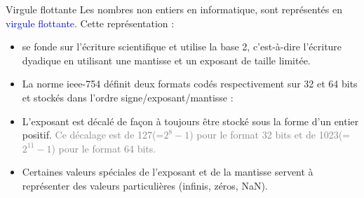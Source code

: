 \documentclass[10pt]{beamer}
\begin{document}
\begin{frame}{\Ctitle}{\stitle}
	\begin{alertblock}{Virgule flottante}
		Les nombres non entiers en informatique, sont représentés en  \textcolor{blue}{virgule flottante}. Cette représentation :
		\begin{itemize}
			\item<1-> se fonde sur l'écriture scientifique et utilise la base 2, c'est-à-dire l'écriture dyadique en utilisant une mantisse et un exposant de taille limitée.
			\item<2-> La norme {\sc ieee-754} définit deux formats codés respectivement sur 32 et 64 bits et stockés dans l'ordre signe/exposant/mantisse : \\
            \item<4->L'exposant est décalé de façon à toujours être stocké sous la forme d'un entier positif. \textcolor{gray}{Ce décalage est de 127(=$2^8-1$) pour le format 32 bits et de 1023(=$2^{11}-1$) pour le format 64 bits.}
            \item<5-> Certaines valeurs spéciales de l'exposant et de la mantisse servent à représenter des valeurs particulières (infinis, zéros, NaN).
		\end{itemize}
	\end{alertblock}
\end{frame}
\end{document}
